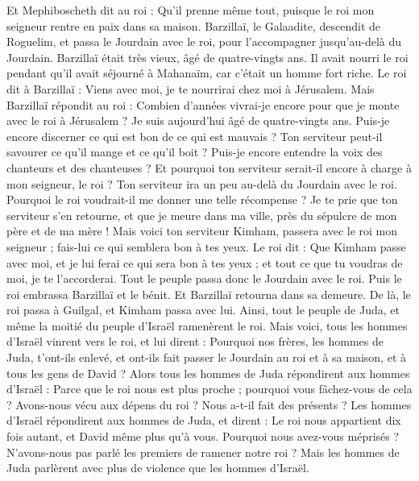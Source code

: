 \begin{multicols}{2}
Et Mephiboscheth dit au roi : Qu'il prenne même tout, puisque le roi mon seigneur rentre en paix dans sa maison.
Barzillaï, le Galaadite, descendit de Roguelim, et passa le Jourdain avec le roi, pour l'accompagner jusqu'au-delà du Jourdain.
Barzillaï était très vieux, âgé de quatre-vingts ans. Il avait nourri le roi pendant qu'il avait séjourné à Mahanaïm, car c'était un homme fort riche.
Le roi dit à Barzillaï : Viens avec moi, je te nourrirai chez moi à Jérusalem.
Mais Barzillaï répondit au roi : Combien d'années vivrai-je encore pour que je monte avec le roi à Jérusalem ?
Je suis aujourd'hui âgé de quatre-vingts ans. Puis-je encore discerner ce qui est bon de ce qui est mauvais ? Ton serviteur peut-il savourer ce qu'il mange et ce qu'il boit ? Puis-je encore entendre la voix des chanteurs et des chanteuses ? Et pourquoi ton serviteur serait-il encore à charge à mon seigneur, le roi ?
Ton serviteur ira un peu au-delà du Jourdain avec le roi. Pourquoi le roi voudrait-il me donner une telle récompense ?
Je te prie que ton serviteur s'en retourne, et que je meure dans ma ville, près du sépulcre de mon père et de ma mère ! Mais voici ton serviteur Kimham, passera avec le roi mon seigneur ; fais-lui ce qui semblera bon à tes yeux.
Le roi dit : Que Kimham passe avec moi, et je lui ferai ce qui sera bon à tes yeux ; et tout ce que tu voudras de moi, je te l'accorderai.
Tout le peuple passa donc le Jourdain avec le roi. Puis le roi embrassa Barzillaï et le bénit. Et Barzillaï retourna dans sa demeure.
De là, le roi passa à Guilgal, et Kimham passa avec lui. Ainsi, tout le peuple de Juda, et même la moitié du peuple d'Israël ramenèrent le roi.
Mais voici, tous les hommes d'Israël vinrent vers le roi, et lui dirent : Pourquoi nos frères, les hommes de Juda, t'ont-ils enlevé, et ont-ils fait passer le Jourdain au roi et à sa maison, et à tous les gens de David ?
Alors tous les hommes de Juda répondirent aux hommes d'Israël : Parce que le roi nous est plus proche ; pourquoi vous fâchez-vous de cela ? Avons-nous vécu aux dépens du roi ? Nous a-t-il fait des présents ?
Les hommes d'Israël répondirent aux hommes de Juda, et dirent : Le roi nous appartient dix fois autant, et David même plus qu'à vous. Pourquoi nous avez-vous méprisés ? N'avons-nous pas parlé les premiers de ramener notre roi ? Mais les hommes de Juda parlèrent avec plus de violence que les hommes d'Israël.

\end{multicols}
